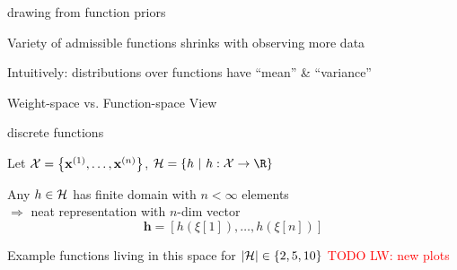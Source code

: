 \documentclass[11pt,compress,t,notes=noshow, xcolor=table]{beamer}
\begin{document}
\begin{framei}{drawing from function priors}
\item Variety of admissible functions shrinks with observing more data
\vfill
{}
\item Intuitively: distributions over functions have ``mean'' \& ``variance''
\end{framei}

\begin{frame}{Weight-space vs. Function-space View}
\end{frame}


\begin{framei}{discrete functions}
\item Let $\mathcal{X} = \left\{ \mathbf{x}^{(1)}, \ldots, \mathbf{x}^{(n)}\right\}$, $\Hspace = \{h ~|~ h: \Xspace \rightarrow \R\}$
\item Any $h \in \mathcal{H}$ has finite domain with $n < \infty$ elements \\$\Rightarrow$ neat representation with $n$-dim vector 
$$\bm{h} = [h(\xi[1]), \dots, h(\xi[n] ) ]$$
\item Example functions living in this space for $|\mathcal{H}| \in \{2, 5, 10\}$
\textcolor{red}{TODO LW: new plots}
\end{framei}

\end{document}

